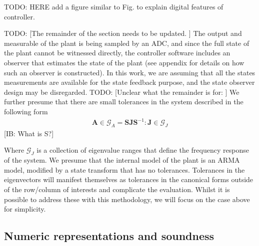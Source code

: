 \documentclass[runningheads,a4paper]{llncs}
\newcommand{\todo}[1]{{\color{red} TODO: #1}}
\newcommand{\commentib}[1]{{\color{blue} [IB: #1]}}
\newcommand{\mat}[1]{\boldsymbol{#1}}
\begin{document}
\todo{HERE add a figure similar to Fig. \label{fig:observersystem} to explain digital features of controller.} 

\todo{[The remainder of the section needs to be updated. ]}
The output and measurable of the plant is being sampled by an ADC, and since the full state of the
plant cannot be witnessed directly, the controller software includes an observer that 
estimates the state of the plant (see appendix for details on how such an observer
is constructed). In this work, we are assuming that all the states measurements are available for the state feedback purpose, and the state observer design may be disregarded.  
\todo{[Unclear what the remainder is for: ]}
We further presume that there are small tolerances in the system 
described in the following form
%
\begin{align*}
\mat{A} \in \mathcal{G}_A=\mat{S}\mat{J}\mat{S}^{-1} : \mat{J} \in \mathcal{G}_J
\end{align*}
\commentib{What is S?}

Where $\mathcal{G}_J$ is a collection of eigenvalue ranges that define the frequency response of the system.
We presume that the internal model of the plant is an ARMA model, modified by a
state transform that has no tolerances. Tolerances in the eigenvectors will manifest themselves
as tolerances in the canonical forms outside of the row/column of interests and complicate the 
evaluation. Whilst it is possible to address these with this methodology, we will focus on the case
above for simplicity.

\subsection{Numeric representations and soundness} 
\label{sec:numeric_rep}
\end{document}
